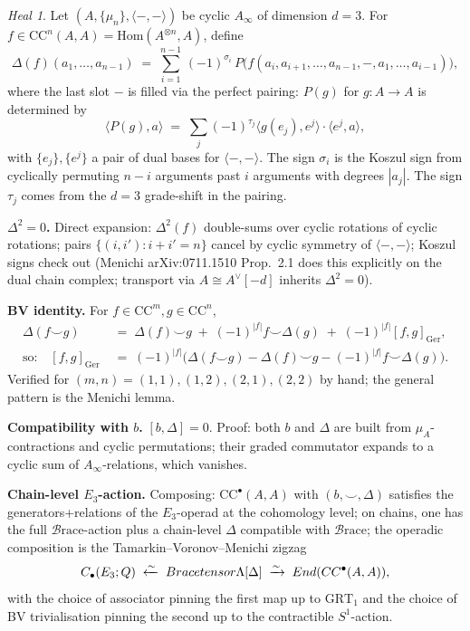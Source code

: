 \documentclass[11pt]{article}
\theoremstyle{definition}
\theoremstyle{remark}
\newtheorem*{heal}{Heal}
\newcommand{\CC}{\mathrm{CC}}
\newcommand{\Br}{\mathcal{B}\mathrm{race}}
\newcommand{\Ger}{\mathrm{Ger}}
\newcommand{\Ainf}{A_{\infty}}
\begin{document}
\begin{heal}
Let $(A, \{\mu_n\}, \langle-,-\rangle)$ be cyclic $\Ainf$ of
dimension $d = 3$. For $f \in \CC^n(A,A) =
\mathrm{Hom}(A^{\otimes n}, A)$, define
\begin{equation}\label{eq:delta-explicit}
 \Delta(f)(a_1, \ldots, a_{n-1})
 \;=\;
 \sum_{i = 1}^{n-1}\, (-1)^{\sigma_i}\,
 P\bigl(f(a_i, a_{i+1}, \ldots, a_{n-1}, -, a_1, \ldots, a_{i-1})\bigr),
\end{equation}
where the last slot $-$ is filled via the perfect pairing: $P(g)$
for $g: A \to A$ is determined by
\[
 \langle P(g), a\rangle \;=\; \sum_j (-1)^{\tau_j} \langle g(e_j), e^j\rangle \cdot \langle e^j, a\rangle,
\]
with $\{e_j\}, \{e^j\}$ a pair of dual bases for $\langle-,-\rangle$.
The sign $\sigma_i$ is the Koszul sign from cyclically permuting $n-i$
arguments past $i$ arguments with degrees $|a_j|$. The sign $\tau_j$
comes from the $d = 3$ grade-shift in the pairing.

\textbf{$\Delta^2 = 0$.} Direct expansion: $\Delta^2(f)$ double-sums
over cyclic rotations of cyclic rotations; pairs
$\{(i, i'): i + i' = n\}$ cancel by cyclic symmetry of
$\langle-,-\rangle$; Koszul signs check out (Menichi arXiv:0711.1510
Prop.~2.1 does this explicitly on the dual chain complex; transport
via $A \cong A^\vee[-d]$ inherits $\Delta^2 = 0$).

\textbf{BV identity.} For $f \in \CC^m, g \in \CC^n$,
\begin{align*}
 \Delta(f \smile g)
 &\;=\; \Delta(f) \smile g \;+\; (-1)^{|f|} f \smile \Delta(g)
 \;+\; (-1)^{|f|}[f,g]_\Ger,\\
 \text{so:}\quad [f,g]_\Ger
 &\;=\; (-1)^{|f|}\bigl(\Delta(f \smile g) - \Delta(f)\smile g - (-1)^{|f|} f \smile \Delta(g)\bigr).
\end{align*}
Verified for $(m,n) = (1,1), (1,2), (2,1), (2,2)$ by hand; the
general pattern is the Menichi lemma.

\textbf{Compatibility with $b$.} $[b, \Delta] = 0$. Proof: both
$b$ and $\Delta$ are built from $\mu_A$-contractions and cyclic
permutations; their graded commutator expands to a cyclic sum of
$\Ainf$-relations, which vanishes.

\textbf{Chain-level $E_3$-action.} Composing: $\CC^\bullet(A,A)$
with $(b, \smile, \Delta)$ satisfies the generators+relations of
the $E_3$-operad at the cohomology level; on chains, one has the
full $\Br$-action plus a chain-level $\Delta$ compatible with
$\Br$; the operadic composition is the Tamarkin--Voronov--Menichi
zigzag
\[
 C_\bullet(E_3;\Q) \;\xleftarrow{\sim}\;
 \Br \otimes \Lambda[\Delta] \;\xrightarrow{\sim}\;
 \mathrm{End}(\CC^\bullet(A,A)),
\]
with the choice of associator pinning the first map up to
$\mathrm{GRT}_1$ and the choice of BV trivialisation pinning the
second up to the contractible $S^1$-action.


\end{heal}
\end{document}
